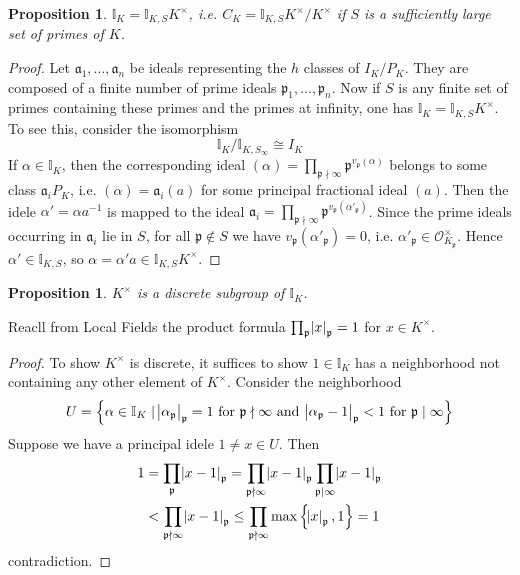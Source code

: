 \documentclass[11pt]{article}
\theoremstyle{definition}
\theoremstyle{plain}
\newtheorem{proposition}[definition]{Proposition}
\theoremstyle{remark}
\newcommand{\II}{\mathbb{I}}
\newcommand{\cO}{\mathcal{O}}
\newcommand{\fa}{\mathfrak{a}}
\newcommand{\fp}{\mathfrak{p}}
\begin{document}
\begin{proposition}\label{prop:9_10}
    $\II_K = \II_{K,S} K^\times$, i.e. $C_K = \II_{K,S} K^\times / K^\times$ if $S$ is a sufficiently large set of primes of $K$.
\end{proposition}
\begin{proof}
    Let $\fa_1, \ldots, \fa_n$ be ideals representing the $h$ classes of $I_K / P_K$. They are composed of a finite number of prime ideals $\fp_1, \ldots, \fp_n$. Now if $S$ is any finite set of primes containing these primes and the primes at infinity, one has $\II_K = \II_{K,S} K^\times$. To see this, consider the isomorphism
    \begin{equation*}
        \II_K / \II_{K, S_\infty} \cong I_K
    \end{equation*}
    If $\alpha \in \II_K$, then the corresponding ideal $(\alpha) = \prod_{\fp \nmid \infty} \fp^{v_\fp(\alpha)}$ belongs to some class $\fa_i P_K$, i.e. $(\alpha) = \fa_i (a)$ for some principal fractional ideal $(a)$. Then the idele $\alpha' = \alpha a^{-1}$ is mapped to the ideal $\fa_i = \prod_{\fp \nmid \infty} \fp^{v_\fp(\alpha'_\fp)}$. Since the prime ideals occurring in $\fa_i$ lie in $S$, for all $\fp \notin S$ we have $v_\fp(\alpha'_\fp) = 0$, i.e. $\alpha'_{\fp} \in \cO_{K_\fp}^\times$. Hence $\alpha' \in \II_{K,S}$, so $\alpha = \alpha' a \in \II_{K, S} K^\times$.
\end{proof}

\begin{proposition}\label{prop:9_11}
    $K^\times$ is a discrete subgroup of $\II_K$.
\end{proposition}

Reacll from Local Fields the product formula $\prod_{\fp} \abs{x}_\fp = 1$ for $x \in K^\times$.

\begin{proof}
    To show $K^\times$ is discrete, it suffices to show $1 \in \II_K$ has a neighborhood not containing any other element of $K^\times$. Consider the neighborhood
    \begin{equation*}
        U = \left\{\alpha \in \II_K \mid \abs{\alpha_\fp}_\fp = 1 \text{ for } \fp \nmid \infty \text{ and } \abs{\alpha_\fp - 1}_\fp < 1 \text{ for } \fp \mid \infty\right\}
    \end{equation*}
    Suppose we have a principal idele $1 \neq x \in U$. Then
    \begin{align*}
        1
        &= \prod_\fp \abs{x - 1}_\fp
        = \prod_{\fp \nmid \infty} \abs{x - 1}_\fp \prod_{\fp \mid \infty} \abs{x - 1}_\fp\\
        &< \prod_{\fp \nmid \infty} \abs{x-1}_\fp
        \le \prod_{\fp \nmid \infty} \max\left\{\abs{x}_\fp, 1\right\} = 1
    \end{align*}
    contradiction.
\end{proof}
\end{document}
